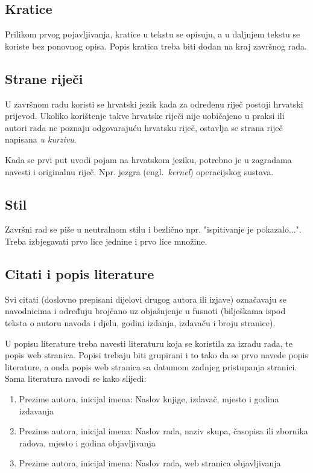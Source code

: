 \subsection{Kratice}

Prilikom prvog pojavljivanja, kratice u tekstu se opisuju, a u daljnjem tekstu se koriste bez ponovnog opisa. Popis kratica treba biti dodan na kraj završnog rada.
\subsection{Strane riječi}
U završnom radu koristi se hrvatski jezik kada za određenu riječ postoji hrvatski prijevod. Ukoliko korištenje takve hrvatske riječi nije 
uobičajeno u praksi ili autori rada ne 
poznaju odgovarajuću hrvatsku riječ, ostavlja se strana riječ napisana \textit{u kurzivu}.

Kada se prvi put uvodi pojam na hrvatskom jeziku, potrebno je u zagradama navesti i originalnu riječ. Npr. jezgra (engl.~\textit{kernel}) operacijskog sustava.  
\subsection{Stil}

Završni rad se piše u neutralnom stilu i bezlično npr. "ispitivanje je pokazalo...". 
Treba izbjegavati prvo lice jednine i prvo lice množine. 
\subsection{Citati i popis literature}

Svi citati (doslovno prepisani dijelovi drugog autora ili izjave) označavaju se navodnicima i
određuju brojčano uz objašnjenje u fusnoti (bilješkama ispod teksta o autoru navoda i djelu, godini izdanja, izdavaču i broju stranice).

U popisu literature treba navesti literaturu koja se koristila za izradu rada, te popis web stranica. Popisi trebaju biti 
grupirani i to tako da se prvo navede popis literature, a onda 
popis web stranica sa datumom zadnjeg pristupanja stranici.
Sama literatura navodi se kako slijedi:
\begin{enumerate}
\item 
Prezime autora, inicijal imena: Naslov knjige, izdavač, mjesto i godina izdavanja
\item Prezime autora, inicijal imena: Naslov rada, naziv skupa, časopisa ili zbornika radova,
mjesto i godina objavljivanja
\item Prezime autora, inicijal imena: Naslov rada, web stranica objavljivanja
\end{enumerate}

